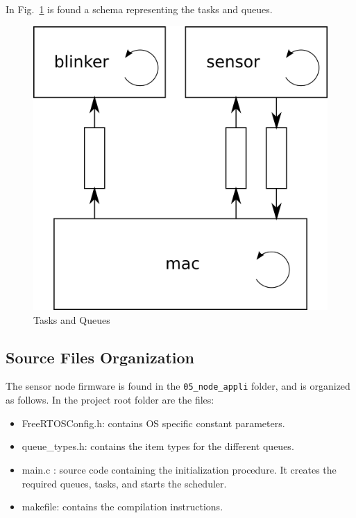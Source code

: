 \documentclass[11pt]{report}
\begin{document}
In Fig.~\ref{fig:queues} is found a schema representing the tasks and queues.

\begin{figure}[ht]
	\begin{center}
	\includegraphics[scale=.8]{figures/queues.png}
	\end{center}
	\caption{Tasks and Queues}
	\label{fig:queues}
\end{figure}

\subsection{Source Files Organization}

The sensor node firmware is found in the \verb$05_node_appli$ folder, and is organized as follows. In the project root folder are the files:
\begin{itemize}
	\item FreeRTOSConfig.h: contains OS specific constant parameters.
	\item queue\_types.h: contains the item types for the different queues.
	\item main.c : source code containing the initialization procedure. It creates the required queues, tasks, and starts the scheduler.
	\item makefile: contains the compilation instructions.
\end{itemize}
\end{document}
